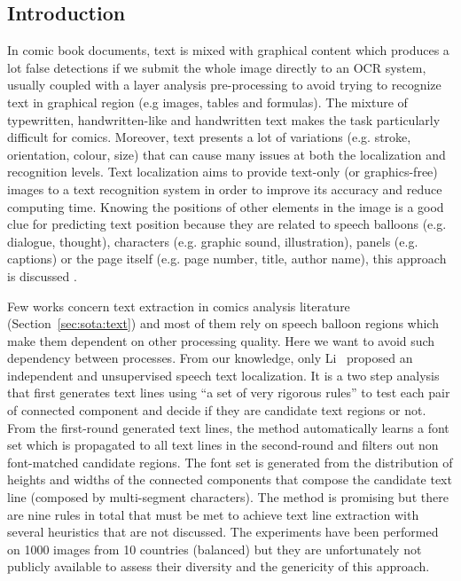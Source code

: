 \subsection{Introduction} %
\label{sub:in:text_introduction}

In comic book documents, text is mixed with graphical content which produces a lot false detections if we submit the whole image directly to an OCR system, usually coupled with a layer analysis pre-processing to avoid trying to recognize text in graphical region (e.g images, tables and formulas).
The mixture of typewritten, handwritten-like and handwritten text makes the task particularly difficult for comics.
Moreover, text presents a lot of variations (e.g. stroke, orientation, colour, size) that can cause many issues at both the localization and recognition levels.
Text localization aims to provide text-only (or graphics-free) images to a text recognition system in order to improve its accuracy and reduce computing time.
Knowing the positions of other elements in the image is a good clue for predicting text position because they are related to speech balloons (e.g. dialogue, thought), characters (e.g. graphic sound, illustration), panels (e.g. captions) or the page itself (e.g. page number, title, author name), this approach is discussed .

Few works concern text extraction in comics analysis literature (Section~\ref{sec:sota:text}) and most of them rely on speech balloon regions which make them dependent on other processing quality.
Here we want to avoid such dependency between processes.
From our knowledge, only Li~\cite{Li2013Unsupervised} proposed an independent and unsupervised speech text localization.
It is a two step analysis that first generates text lines using ``a set of very rigorous rules'' to test each pair of connected component and decide if they are candidate text regions or not.
From the first-round generated text lines, the method automatically learns a font set which is propagated to all text lines in the second-round and filters out non font-matched candidate regions.
The font set is generated from the distribution of heights and widths of the connected components that compose the candidate text line (composed by multi-segment characters).
The method is promising but there are nine rules in total that must be met to achieve text line extraction with several heuristics that are not discussed.
The experiments have been performed on 1000 images from 10 countries (balanced) but they are unfortunately not publicly available to assess their diversity and the genericity of this approach. 


